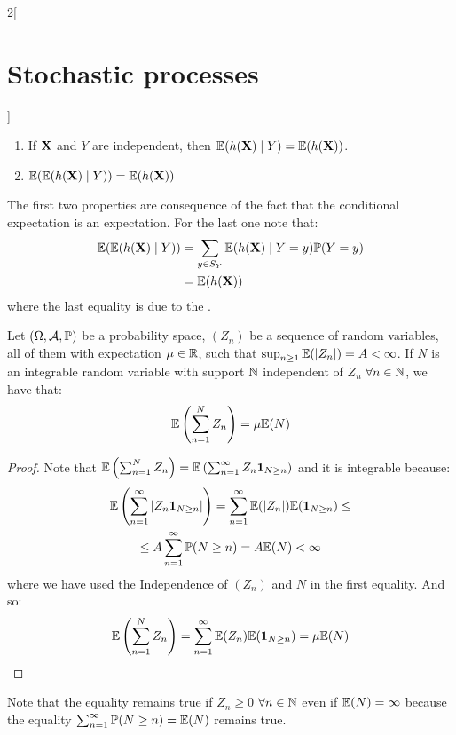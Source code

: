 \documentclass[../../../main_math.tex]{subfiles}
\begin{document}
\begin{multicols}{2}[\section{Stochastic processes}]
\begin{proposition}
\begin{enumerate}
      \item If $\boldsymbol{\mathrm{X}}$ and $Y$ are independent, then $\mathbb{E}(h(\boldsymbol{\mathrm{X}})\mid Y)=\mathbb{E}(h(\boldsymbol{\mathrm{X}}))$.
      \item $\mathbb{E}(\mathbb{E}(h(\boldsymbol{\mathrm{X}})\mid Y))=\mathbb{E}(h(\boldsymbol{\mathrm{X}}))$
    \end{enumerate}
  \end{proposition}
  \begin{sproof}
    The first two properties are consequence of the fact that the conditional expectation is an expectation. For the last one note that:
    \begin{align*}
      \mathbb{E}(\mathbb{E}(h(\boldsymbol{\mathrm{X}})\mid Y)) & =\sum_{y\in S_Y}\mathbb{E}(h(\boldsymbol{\mathrm{X}})\mid Y=y)\mathbb{P}(Y=y) \\
                                  & =\mathbb{E}(h(\boldsymbol{\mathrm{X}}))
    \end{align*}
    where the last equality is due to the .
  \end{sproof}
  \begin{theorem}
    Let $(\Omega,\mathcal{A},\mathbb{P})$ be a probability space, $(Z_n)$ be a sequence of random variables, all of them with expectation $\mu\in\mathbb{R}$, such that $\sup_{n\geq 1}\mathbb{E}(\abs{Z_n})=A<\infty$. If $N$ is an integrable random variable with support $\mathbb{N}$ independent of $Z_n$ $\forall n\in\mathbb{N}$, we have that:
    $$\mathbb{E}\left(\sum_{n=1}^NZ_n\right)=\mu\mathbb{E}(N)$$
  \end{theorem}
  \begin{proof}
    Note that $\mathbb{E}\left(\sum_{n=1}^NZ_n\right)=\mathbb{E}\left(\sum_{n=1}^\infty Z_n\boldsymbol{\mathrm{1}}_{N\geq n}\right)$ and it is integrable because:
    \begin{multline*}
      \mathbb{E}\left(\sum_{n=1}^\infty \abs{Z_n\boldsymbol{\mathrm{1}}_{N\geq n}}\right) =\sum_{n=1}^\infty \mathbb{E}(\abs{Z_n})\mathbb{E}(\boldsymbol{\mathrm{1}}_{N\geq n}) \leq              \\
      \leq A\sum_{n=1}^\infty \mathbb{P}(N\geq n) =A\mathbb{E}(N)<\infty
    \end{multline*}
    where we have used the Independence of $(Z_n)$ and $N$ in the first equality.
    And so:
    $$\mathbb{E}\left(\sum_{n=1}^NZ_n\right)=\sum_{n=1}^\infty \mathbb{E}(Z_n)\mathbb{E}(\boldsymbol{\mathrm{1}}_{N\geq n})=\mu\mathbb{E}(N)$$
  \end{proof}
  \begin{remark}
    Note that the equality remains true if $Z_n\geq 0$ $\forall n\in\mathbb{N}$ even if $\mathbb{E}(N)=\infty$ because the equality $\sum_{n=1}^\infty \mathbb{P}(N\geq n)=\mathbb{E}(N)$ remains true.
  \end{remark}

\end{multicols}
\end{document}
